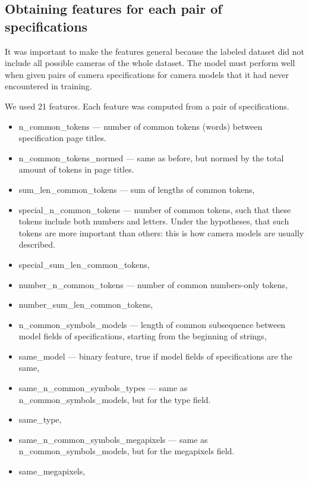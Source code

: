 \documentclass[sigconf]{acmart}
\begin{document}
\subsection{Obtaining features for each pair of specifications}

It was important to make the features general because the labeled dataset did not include all possible cameras of the whole dataset. The model must perform well when given pairs of camera specifications for camera models that it had never encountered in training.

We used 21 features. Each feature was computed from a pair of specifications.
\begin{itemize}
\item n\_common\_tokens — number of common tokens (words) between specification page titles.
\item n\_common\_tokens\_normed — same as before, but normed by the total amount of tokens in page titles.
\item sum\_len\_common\_tokens — sum of lengths of common tokens,

\item special\_n\_common\_tokens — number of common tokens, such that these tokens include both numbers and letters. Under the hypotheses, that such tokens are more important than others: this is how camera models are usually described.
\item special\_sum\_len\_common\_tokens,
\item number\_n\_common\_tokens — number of common numbers-only tokens,
\item number\_sum\_len\_common\_tokens,

\item n\_common\_symbols\_models — length of common subsequence between model fields of specifications, starting from the beginning of strings,
\item same\_model — binary feature, true if model fields of specifications are the same,

\item same\_n\_common\_symbols\_types — same as \\ n\_common\_symbols\_models, but for the type field.
\item same\_type, 

\item same\_n\_common\_symbols\_megapixels — same as \\ n\_common\_symbols\_models, but for the megapixels field.
\item same\_megapixels,


\end{itemize}
\end{document}
